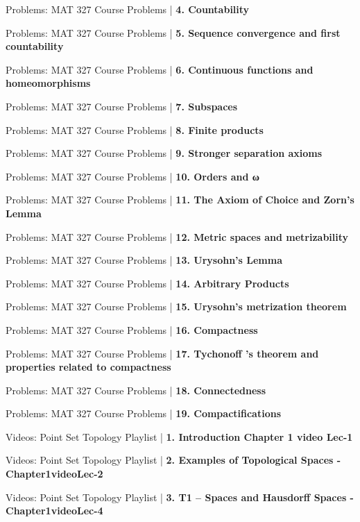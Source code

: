 \documentclass[a4, landscape, 12pt]{article}
\newcommand{\checkbox}{$\square$}%
\begin{document}
\begin{itemize}
{{}
\item [\checkbox] Problems: MAT 327 Course Problems  | \textbf{4. Countability
}
\item [\checkbox] Problems: MAT 327 Course Problems  | \textbf{5. Sequence convergence and first countability
}
\item [\checkbox] Problems: MAT 327 Course Problems  | \textbf{6. Continuous functions and homeomorphisms
}
\item [\checkbox] Problems: MAT 327 Course Problems  | \textbf{7. Subspaces
}
\item [\checkbox] Problems: MAT 327 Course Problems  | \textbf{8. Finite products
}
\item [\checkbox] Problems: MAT 327 Course Problems  | \textbf{9. Stronger separation axioms
}
\item [\checkbox] Problems: MAT 327 Course Problems  | \textbf{10. Orders and ω
}
\item [\checkbox] Problems: MAT 327 Course Problems  | \textbf{11. The Axiom of Choice and Zorn’s Lemma
}
\item [\checkbox] Problems: MAT 327 Course Problems  | \textbf{12. Metric spaces and metrizability
}
\item [\checkbox] Problems: MAT 327 Course Problems  | \textbf{13. Urysohn’s Lemma
}
\item [\checkbox] Problems: MAT 327 Course Problems  | \textbf{14. Arbitrary Products
}
\item [\checkbox] Problems: MAT 327 Course Problems  | \textbf{15. Urysohn’s metrization theorem
}
\item [\checkbox] Problems: MAT 327 Course Problems  | \textbf{16. Compactness
}
\item [\checkbox] Problems: MAT 327 Course Problems  | \textbf{17. Tychonoff ’s theorem and properties related to compactness
}
\item [\checkbox] Problems: MAT 327 Course Problems  | \textbf{18. Connectedness
}
\item [\checkbox] Problems: MAT 327 Course Problems  | \textbf{19. Compactifications
}
\item [\checkbox] Videos: Point Set Topology Playlist  | \textbf{1. Introduction Chapter 1 video Lec-1
}
\item [\checkbox] Videos: Point Set Topology Playlist  | \textbf{2. Examples of Topological Spaces - Chapter1videoLec-2
}
\item [\checkbox] Videos: Point Set Topology Playlist  | \textbf{3. T1 – Spaces and Hausdorff Spaces - Chapter1videoLec-4
}}
\end{itemize}
\end{document}

